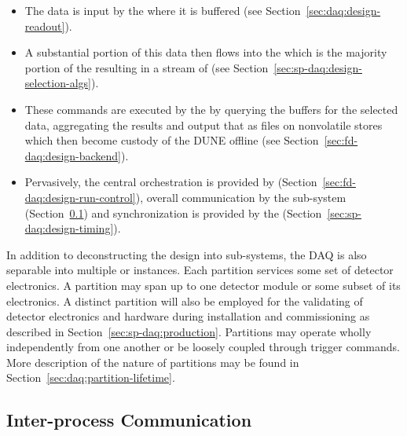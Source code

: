 \begin{itemize}
\item The data is input by the  where it is buffered (see Section~\ref{sec:daq:design-readout}).

\item A substantial portion of this data then flows into the  which is the majority portion of the  resulting in a stream of  (see Section~\ref{sec:sp-daq:design-selection-algs}).

\item These commands are executed by the  by querying the buffers for the selected data, aggregating the results and output that as files on nonvolatile stores which then become custody of the DUNE offline (see Section~\ref{sec:fd-daq:design-backend}).

\item Pervasively, the central orchestration is provided by  (Section~\ref{sec:fd-daq:design-run-control}), overall communication by the  sub-system (Section~\ref{sec:daq:design-ipc}) and synchronization is provided by the  (Section~\ref{sec:sp-daq:design-timing}).
\end{itemize}


In addition to deconstructing the design into sub-systems, the DAQ is also separable into multiple  or instances. 
Each partition services some set of detector electronics. 
A partition may span up to one detector module or some subset of its electronics. 
A distinct partition will also be employed for the validating of detector electronics and hardware during installation and commissioning as described in Section~\ref{sec:sp-daq:production}.
Partitions may operate wholly independently from one another or be loosely coupled through trigger commands.  
More description of the nature of partitions may be found in Section~\ref{sec:daq:partition-lifetime}.



  



\subsection{Inter-process Communication}
\label{sec:daq:design-ipc}

